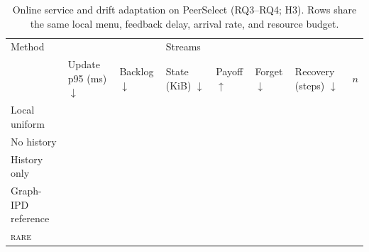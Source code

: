 \documentclass[sigconf,anonymous]{aamas}
\newcommand{\blank}{\textemdash}
\newcommand{\rare}{\textsc{rare}}
\newcommand{\metric}[1]{\makecell[c]{#1}}
\newcommand{\dashrow}{\blank & \blank & \blank & \blank & \blank & \blank}
\begin{document}
\begin{table}[!ht]
\centering
\small
\setlength{\tabcolsep}{4pt}
\renewcommand{\arraystretch}{1.12}
\begin{tabular}{@{}l*{7}{>{\centering\arraybackslash}p{}}@{}}
\toprule
Method & \multicolumn{3}{c}{PeerSelect: service} & \multicolumn{3}{c}{PeerSelect: adaptation} & Streams\\
\cmidrule(lr){2-4}\cmidrule(lr){5-7}
 & \metric{Update p95\\(ms) $\downarrow$} & Backlog $\downarrow$ & \metric{State\\(KiB) $\downarrow$} & Payoff $\uparrow$ & Forget $\downarrow$ & \metric{Recovery\\(steps) $\downarrow$} & $n$\\
\midrule
Local uniform & \dashrow & \blank\\
No history & \dashrow & \blank\\
History only & \dashrow & \blank\\
Graph-IPD reference & \dashrow & \blank\\
\midrule
\rare{} & \dashrow & \blank\\
\bottomrule
\end{tabular}
\caption{Online service and drift adaptation on PeerSelect (RQ3--RQ4; H3). Rows share the same local menu, feedback delay, arrival rate, and resource budget.}
\label{tab:body-service}
\end{table}
\end{document}
